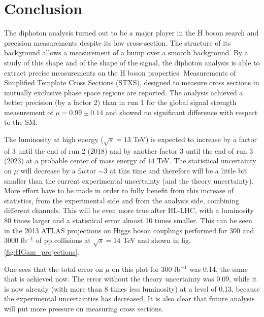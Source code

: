 

\section{Conclusion}
\label{sec:orgffb6129}
The diphoton analysis turned out to be a major player in the H boson search and precision measurements despite its low cross-section.
The structure of its background allows a measurement of a bump over a smooth background.
By a study of this shape and of the shape of the signal, the diphoton analysis is able to extract precise measurements on the H boson properties.
Measurements of Simplified Template Cross Sections (STXS), designed to measure cross sections in mutually exclusive phase space regions are reported.
The analysis achieved a better precision (by a factor 2) than in run 1 for the global signal strength measurement of $\mu=0.99\pm 0.14$ and showed no significant difference with respect to the SM.

The luminosity at high energy ($\sqrt{s}=13$ TeV) is expected to increase by a factor of 3 until the end of run 2 (2018) and by another factor 3 until the end of run 3 (2023) at a probable center of mass energy of $14$ TeV.
The statistical uncertainty on $\mu$ will decrease by a factor $\sim 3$ at this time and therefore will be a little bit smaller than the current experimental uncertainty (and the theory uncertainty).
More effort have to be made in order to fully benefit from this increase of statistics, from the experimental side and from the analysis side, combining different channels.
This will be even more true after HL-LHC, with a luminosity 80 times larger and a statistical error almost 10 times smaller.
This can be seen in the 2013 ATLAS projections on Higgs boson couplings performed for 300 and 3000 fb$^{-1}$ of pp collisions at $\sqrt{s}=14$ TeV \cite{} and shown in fig. \ref{fig:HGam_projections}.

One sees that the total error on $\mu $ on this plot for 300 fb$^{-1}$ was 0.14, the same that is achieved now.
The error without the theory uncertainty was 0.09, while it is now already (with more than 8 times less luminosity) at a level of 0.13, because the experimental uncertainties has decreased.
It is also clear that future analysis will put more pressure on measuring cross sections.
